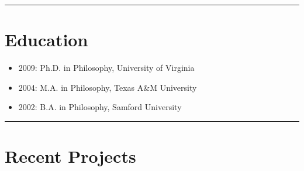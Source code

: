 \documentclass{article}
\begin{document}
\hrule
\section{Education} %
\label{sec:Education}

\begin{itemize}
  \item 2009: Ph.D. in Philosophy, University of Virginia
  \item 2004: M.A. in Philosophy, Texas A\&M University
  \item 2002: B.A. in Philosophy, Samford University
\end{itemize}
\newpage
\hrule
\section{Recent Projects} %
\label{sec:Recent Projects}
\end{document}
